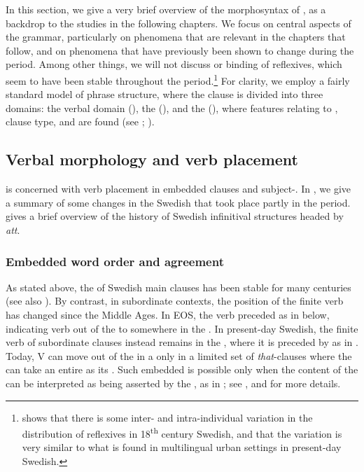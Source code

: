 \documentclass[output=paper]{langscibook}
\begin{document}
In this section, we give a very brief overview of the morphosyntax of , as a backdrop to the studies in the following chapters. We focus on central aspects of the grammar, particularly on phenomena that are relevant in the chapters that follow, and on phenomena that have previously been shown to change during the  period. Among other things, we will not discuss  or binding of reflexives, which seem to have been stable throughout the  period.\footnote{\citet{Tingsell2010} shows that there is some inter- and intra-individual variation in the distribution of reflexives in 18\textsuperscript{th} century Swedish, and that the variation is very similar to what is found in multilingual urban settings in present-day Swedish.}  For clarity, we employ a fairly standard model of phrase structure, where the clause is divided into three domains: the verbal domain (), the  (), and the  (), where features relating to , clause type, and  are found (see \citealt{Platzack2010}; \citealt{Faarlund2019}). 


\subsection{Verbal morphology and verb placement}\label{sec:intro:3.1}


 is concerned with verb placement in embedded clauses and subject-. In , we give a summary of some changes in the Swedish  that took place partly in the  period.  gives a brief overview of the history of Swedish infinitival structures headed by \textit{att}.


\subsubsection{Embedded word order and agreement}\label{sec:intro:3.1.1}


As stated above, the  of Swedish main clauses has been stable for many centuries (see also \citealt{Alving1916}). By contrast, in subordinate contexts, the position of the finite verb has changed since the Middle Ages. In EOS, the verb preceded  as in  below, indicating verb  out of the  to somewhere in the . In present-day Swedish, the finite verb of subordinate clauses instead remains in the , where it is preceded by  as in . Today, V can move out of the  in a  only in a limited set of \textit{that}{}-clauses where the  can take an entire  as its . Such embedded   is possible only when the content of the  can be interpreted as being asserted by the , as in ; see \citet{Julien2015},  and  for more details.
\end{document}
